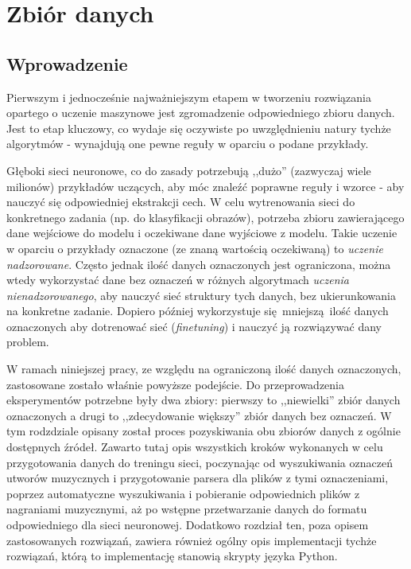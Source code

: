 \chapter{Zbiór danych}

\section{Wprowadzenie}

Pierwszym i jednocześnie najważniejszym etapem w tworzeniu rozwiązania opartego o uczenie maszynowe
jest zgromadzenie odpowiedniego zbioru danych. Jest to etap kluczowy, co wydaje się oczywiste po
uwzględnieniu natury tychże algorytmów - wynajdują one pewne reguły w oparciu o podane przykłady.

Głęboki sieci neuronowe, co do zasady potrzebują ,,dużo'' (zazwyczaj wiele milionów) przykładów
uczących, aby móc znaleźć poprawne reguły i wzorce - aby nauczyć się odpowiedniej ekstrakcji cech. W
celu wytrenowania sieci do konkretnego zadania (np. do klasyfikacji obrazów), potrzeba zbioru
zawierającego dane wejściowe do modelu i oczekiwane dane wyjściowe z modelu. Takie uczenie w oparciu
o przykłady oznaczone (ze znaną wartością oczekiwaną) to \emph{uczenie nadzorowane}. Często jednak
ilość danych oznaczonych jest ograniczona, można wtedy wykorzystać dane bez oznaczeń w różnych
algorytmach \emph{uczenia nienadzorowanego}, aby nauczyć sieć struktury tych danych, bez
ukierunkowania na konkretne zadanie. Dopiero później wykorzystuje się mniejszą ilość danych
oznaczonych aby dotrenować sieć (\emph{finetuning}) i nauczyć ją rozwiązywać dany problem.

W ramach niniejszej pracy, ze względu na ograniczoną ilość danych oznaczonych, zastosowane zostało
właśnie powyższe podejście. Do przeprowadzenia eksperymentów potrzebne były dwa zbiory: pierwszy to
,,niewielki'' zbiór danych oznaczonych a drugi to ,,zdecydowanie większy'' zbiór danych bez
oznaczeń. W tym rodzdziale opisany został proces pozyskiwania obu zbiorów danych z ogólnie
dostępnych źródeł. Zawarto tutaj opis wszystkich kroków wykonanych w celu przygotowania danych do
treningu sieci, poczynając od wyszukiwania oznaczeń utworów muzycznych i przygotowanie parsera dla
plików z tymi oznaczeniami, poprzez automatyczne wyszukiwania i pobieranie odpowiednich plików z
nagraniami muzycznymi, aż po wstępne przetwarzanie danych do formatu odpowiedniego dla sieci
neuronowej. Dodatkowo rozdział ten, poza opisem zastosowanych rozwiązań, zawiera również ogólny opis
implementacji tychże rozwiązań, którą to implementację stanowią skrypty języka Python.


